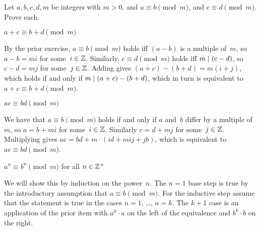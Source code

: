 \documentclass{ibl}  %
\begin{document}
\begin{problem}
Let $a,b,c,d,m$ be integers with $m>0$, and
$a\equiv b\pmod m$, and $c\equiv d\pmod m$.
Prove each.
\begin{exes}
\begin{exercise}
  $a+c\equiv b+d\pmod m$
\end{exercise}
\begin{answer}
  By the prior exercise, $a\equiv b\pmod m$ holds iff 
  $(a-b)$ is a multiple of~$m$, 
  so $a-b=mi$ for some~$i\in\mathbb{Z}$.
  Similarly, $c\equiv d\pmod m$ holds iff $m\mid (c-d)$, 
  so $c-d=mj$ for some~$j\in\mathbb{Z}$.
  Adding gives $(a+c)-(b+d)=m(i+j)$, which holds if and only if
  $m\mid (a+c)-(b+d)$, which in turn is equivalent to
  $a+c\equiv b+d\pmod m$.
\end{answer}
\begin{exercise} 
  $ac\equiv bd\pmod m$
\end{exercise}
\begin{answer}
  We have that $a\equiv b\pmod m$ holds if and only if
  $a$ and~$b$ differ by a multiple of~$m$, so 
  $a=b+mi$ for some~$i\in\mathbb{Z}$. 
  Similarly $c=d+mj$ for some~$j\in\mathbb{Z}$.
  Multiplying gives $ac=bd+m\cdot(id+mij+jb)$, 
  which is equivalent to $ac\equiv bd\pmod m$.   
\end{answer}
\begin{exercise}[\maxlength] 
  $a^n\equiv b^n\pmod m$ for all $n\in\mathbb{Z}^+$
\end{exercise}
\begin{answer}
  We will show this by induction on the power~$n$.
  The $n=1$ base step is true by the introductory assumption that 
  $a\equiv b\pmod m$.
  For the inductive step assume that the statement is true in the cases
  $n=1$, \ldots, $n=k$.
  The $k+1$ case is an application of the prior item with 
  $a^k\cdot a$ on the left of the equivalence and $b^k\cdot b$ on the
  right.  
\end{answer}
\end{exes}

\end{problem}
\end{document}
